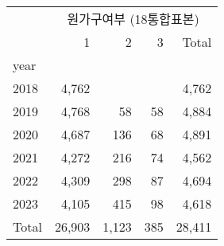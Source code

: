 \documentclass{article}
\begin{document}
\begin{table}[!h]
\centering
\begin{tabular}{lllll}
\cline{1-5}
\multicolumn{1}{c}{} &
  \multicolumn{4}{|c}{원가구여부 (18통합표본)} \\
\multicolumn{1}{c}{} &
  \multicolumn{1}{|r}{1} &
  \multicolumn{1}{r}{2} &
  \multicolumn{1}{r}{3} &
  \multicolumn{1}{r}{Total} \\
\cline{1-5}
\multicolumn{1}{l}{year} &
  \multicolumn{1}{|r}{} &
  \multicolumn{1}{r}{} &
  \multicolumn{1}{r}{} &
  \multicolumn{1}{r}{} \\
\multicolumn{1}{l}{\hspace{1em}2018} &
  \multicolumn{1}{|r}{4,762} &
  \multicolumn{1}{r}{} &
  \multicolumn{1}{r}{} &
  \multicolumn{1}{r}{4,762} \\
\multicolumn{1}{l}{\hspace{1em}2019} &
  \multicolumn{1}{|r}{4,768} &
  \multicolumn{1}{r}{58} &
  \multicolumn{1}{r}{58} &
  \multicolumn{1}{r}{4,884} \\
\multicolumn{1}{l}{\hspace{1em}2020} &
  \multicolumn{1}{|r}{4,687} &
  \multicolumn{1}{r}{136} &
  \multicolumn{1}{r}{68} &
  \multicolumn{1}{r}{4,891} \\
\multicolumn{1}{l}{\hspace{1em}2021} &
  \multicolumn{1}{|r}{4,272} &
  \multicolumn{1}{r}{216} &
  \multicolumn{1}{r}{74} &
  \multicolumn{1}{r}{4,562} \\
\multicolumn{1}{l}{\hspace{1em}2022} &
  \multicolumn{1}{|r}{4,309} &
  \multicolumn{1}{r}{298} &
  \multicolumn{1}{r}{87} &
  \multicolumn{1}{r}{4,694} \\
\multicolumn{1}{l}{\hspace{1em}2023} &
  \multicolumn{1}{|r}{4,105} &
  \multicolumn{1}{r}{415} &
  \multicolumn{1}{r}{98} &
  \multicolumn{1}{r}{4,618} \\
\multicolumn{1}{l}{\hspace{1em}Total} &
  \multicolumn{1}{|r}{26,903} &
  \multicolumn{1}{r}{1,123} &
  \multicolumn{1}{r}{385} &
  \multicolumn{1}{r}{28,411} \\
\cline{1-5}
\end{tabular}
\end{table}
\end{document}
